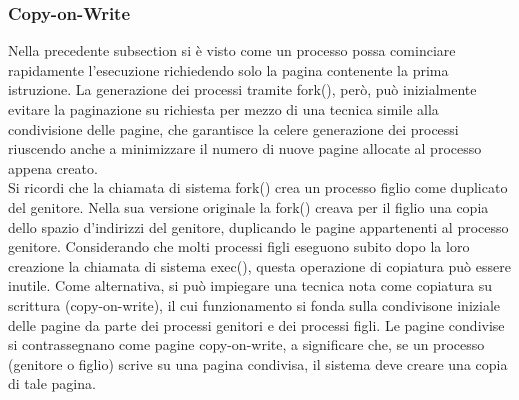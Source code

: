 \documentclass{article}
\begin{document}
			\subsubsection{Copy-on-Write}
				Nella precedente subsection si è visto come un processo possa cominciare rapidamente l’esecuzione richiedendo solo la pagina contenente la prima istruzione. La generazione dei processi tramite fork(), però, può inizialmente evitare la paginazione su richiesta per mezzo di una tecnica simile alla condivisione delle pagine, che garantisce la celere generazione dei processi riuscendo anche a minimizzare il numero di nuove pagine allocate al processo appena creato.
				\\Si ricordi che la chiamata di sistema fork() crea un processo figlio come duplicato del genitore. Nella sua versione originale la fork() creava per il figlio una copia dello spazio d’indirizzi del genitore, duplicando le pagine appartenenti al processo genitore. Considerando che molti processi figli eseguono subito dopo la loro creazione la chiamata di sistema exec(), questa operazione di copiatura può essere inutile. Come alternativa, si può impiegare una tecnica nota come copiatura su scrittura (copy-on-write), il cui funzionamento si fonda sulla condivisone iniziale delle pagine da parte dei processi genitori e dei processi figli. Le pagine condivise si contrassegnano come pagine copy-on-write, a significare che, se un processo (genitore o figlio) scrive su una pagina condivisa, il sistema deve creare una copia di tale pagina. 
				\begin{figure}[ht!]
				\end{figure}
				\begin{figure}[ht!]
				\end{figure}
\end{document}

